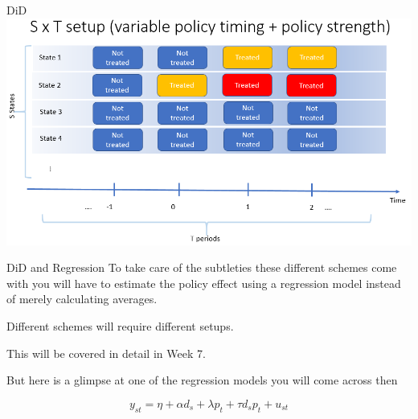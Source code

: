 \documentclass[
  ignorenonframetext,
]{beamer}
\begin{document}
\begin{frame}{DiD}
\label{did-5}
\includegraphics{2xTslide4.PNG}
\end{frame}

\begin{frame}{DiD and Regression}
\label{did-and-regression}
To take care of the subtleties these different schemes come with you
will have to estimate the policy effect using a regression model instead
of merely calculating averages.

Different schemes will require different setups.

This will be covered in detail in Week 7.

But here is a glimpse at one of the regression models you will come
across then

\[y_{st}=\eta + \alpha d_s + \lambda p_t + \tau d_s p_t + u_{st}\]
\end{frame}
\end{document}
